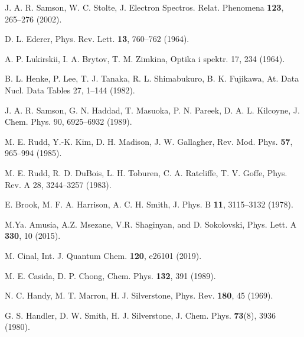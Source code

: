 \begin{thebibliography}{9}
J. A. R. Samson, W. C. Stolte, 
J. Electron Spectros. Relat. Phenomena \textbf{123}, 265--276 (2002).

D. L. Ederer, 
Phys. Rev. Lett. \textbf{13}, 760--762 (1964).

A. P. Lukirskii, I. A. Brytov, T. M. Zimkina, 
Optika i spektr. 17, 234 (1964).

B. L. Henke, P. Lee, T. J. Tanaka, R. L. Shimabukuro, B. K. Fujikawa, 
At. Data Nucl. Data Tables 27, 1--144 (1982).

J. A. R. Samson, G. N. Haddad, T. Masuoka, P. N. Pareek, D. A. L. Kilcoyne, 
J. Chem. Phys. 90, 6925--6932 (1989).


M. E. Rudd, Y.-K. Kim, D. H. Madison, J. W. Gallagher, 
Rev. Mod. Phys. \textbf{57}, 965--994 (1985).

M. E. Rudd, R. D. DuBois, L. H. Toburen, C. A. Ratcliffe, T. V. Goffe, 
Phys. Rev. A 28, 3244--3257 (1983).

E. Brook, M. F. A. Harrison, A. C. H. Smith, 
J. Phys. B \textbf{11}, 3115--3132 (1978).


M.Ya. Amusia, A.Z. Msezane, V.R. Shaginyan, and D. Sokolovski, 
Phys. Lett. A {\bf 330}, 10 (2015).


M. Cinal,
Int. J. Quantum Chem. \textbf{120}, e26101 (2019).

M. E. Casida, D. P. Chong, 
Chem. Phys. \textbf{132}, 391 (1989).


N. C. Handy, M. T. Marron, H. J. Silverstone, 
Phys. Rev. \textbf{180}, 45 (1969).

G. S. Handler, D. W. Smith, H. J. Silverstone, 
J. Chem. Phys. \textbf{73}(8), 3936 (1980).


\end{thebibliography}

